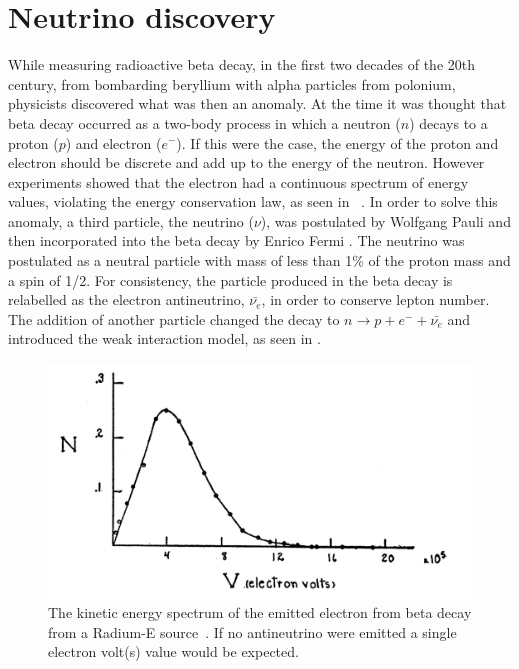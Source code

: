 \section{Neutrino discovery}\label{section:Theory}
While measuring radioactive beta decay, in the first two decades of the 20th century, from bombarding beryllium with alpha particles from polonium, physicists discovered what was then an anomaly. At the time it was thought that beta decay occurred as a two-body process in which a neutron ($n$) decays to a proton ($p$) and electron ($e^-$). If this were the case, the energy of the proton and electron should be discrete and add up to the energy of the neutron. However experiments showed that the electron had a continuous spectrum of energy values, violating the energy conservation law, as seen in ~\cite{89Neary71}. In order to solve this anomaly, a third particle, the neutrino ($\nu$), was postulated by Wolfgang Pauli \cite{4Pauli:Online} and then incorporated into the beta decay by Enrico Fermi \cite{5Wilson}. The neutrino was postulated as a neutral particle with mass of less than 1\% of the proton mass and a spin of 1/2. For consistency, the particle produced in the beta decay is relabelled as the electron antineutrino, $\bar{\nu_e}$, in order to conserve lepton number. The addition of another particle changed the decay to $n \rightarrow p + e^- + \bar{\nu_e}$ and introduced the weak interaction model, as seen in . 

\begin{figure}[h!]
\includegraphics[width=\textwidth]{figures/betaRadium.jpeg}
\caption{The kinetic energy spectrum of the emitted electron from beta decay from a Radium-E source~\cite{RadiumE}. If no antineutrino were emitted a single electron volt(s) value would be expected.}
\label{fig:betaeng}
\end{figure}

